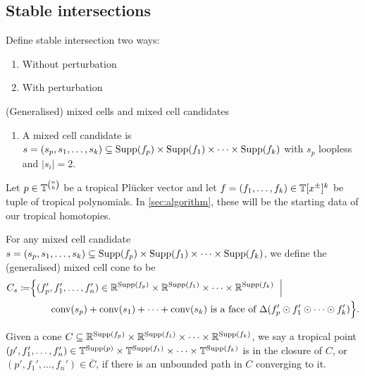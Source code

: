 \begin{example}

\end{example}

\subsection{Stable intersections}

\begin{definition}
  Define stable intersection two ways:
  \begin{enumerate}
  \item Without perturbation
  \item With perturbation
  \end{enumerate}
\end{definition}

\begin{definition}
  (Generalised) mixed cells and mixed cell candidates
  \begin{enumerate}
      \item A mixed cell candidate is $s=(s_p,s_1,\dots,s_k)\subseteq \operatorname{Supp}(f_p)\times\operatorname{Supp}(f_1)\times\dots\times\operatorname{Supp}(f_k)$ with $s_p$ loopless and $|s_i|=2$.
  \end{enumerate}
\end{definition}

\begin{definition}
  Let $p\in \mathbb{T}^{\binom{n}{k}}$ be a tropical Pl\"ucker vector and let $f=(f_1,\dots,f_k)\in\mathbb{T}[x^\pm]^k$ be tuple of tropical polynomials.  In \cref{sec:algorithm}, these will be the starting data of our tropical homotopies.

  For any mixed cell candidate $s=(s_p,s_1,\dots,s_k)\subseteq \operatorname{Supp}(f_p)\times\operatorname{Supp}(f_1)\times\dots\times\operatorname{Supp}(f_k)$, we define the (generalised) mixed cell cone to be
  \begin{align*}
    C_s\coloneqq &\Big\{ (f_p',f_1',\dots,f_n')\in \RR^{\Supp(f_p)}\times\RR^{\Supp(f_1)}\times\dots\times\RR^{\Supp(f_k)} \bigmid \\
    &\hspace{7mm}\conv(s_p)+\conv(s_1)+\dots+\conv(s_k) \text{ is a face of }\Delta(f_p'\odot f_1'\odot\dots\odot f_k')\Big\}.
  \end{align*}

  Given a cone $C\subseteq \mathbb{R}^{\operatorname{Supp}(f_p)}\times\mathbb{R}^{\operatorname{Supp}(f_1)}\times\dots\times\mathbb{R}^{\operatorname{Supp}(f_k)}$, we say a tropical point $(p',f_1',\dots,f_n')\in\mathbb{T}^{\operatorname{Supp}(p)}\times\mathbb{T}^{\operatorname{Supp}(f_1)}\times\dots\times\mathbb{T}^{\operatorname{Supp}(f_k)}$ is in the closure of $C$, or $(p',f_1',\dots,f_n')\in\overline C$, if there is an unbounded path in $C$ converging to it.
\end{definition}
